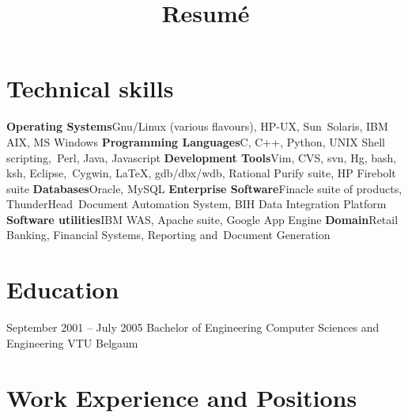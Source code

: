 \documentclass[11pt,a4paper,sans]{moderncv}
\title{Resumé}
\begin{document}
\maketitle

\section{Technical skills}
\cvcomputer
{\textbf{Operating Systems}}{Gnu/Linux (various flavours), HP-UX, Sun\
	Solaris, IBM AIX, MS Windows}
{\textbf{Programming Languages}}{C, C++, Python, UNIX Shell scripting,\
	Perl, Java, Javascript}
\cvcomputer
{\textbf{Development Tools}}{Vim, CVS, svn, Hg, bash, ksh, Eclipse,\
Cygwin, \textrm{\LaTeX}, gdb/dbx/wdb, Rational Purify suite, HP Firebolt suite}
{\textbf{Databases}}{Oracle, MySQL}
\cvcomputer
{\textbf{Enterprise Software}}{Finacle suite of products, ThunderHead\
	Document Automation System, BIH Data Integration Platform}
{\textbf{Software utilities}}{IBM WAS, Apache suite, Google App Engine}
\cvcomputer
{\textbf{Domain}}{Retail Banking, Financial Systems, Reporting and\
Document Generation}
{}{}

\section{Education}

\cventry
{September 2001 -- July 2005}
{Bachelor of Engineering}
{Computer Sciences and Engineering}
{VTU Belgaum}
{}
{} %

\section{Work Experience and Positions}
\end{document}
